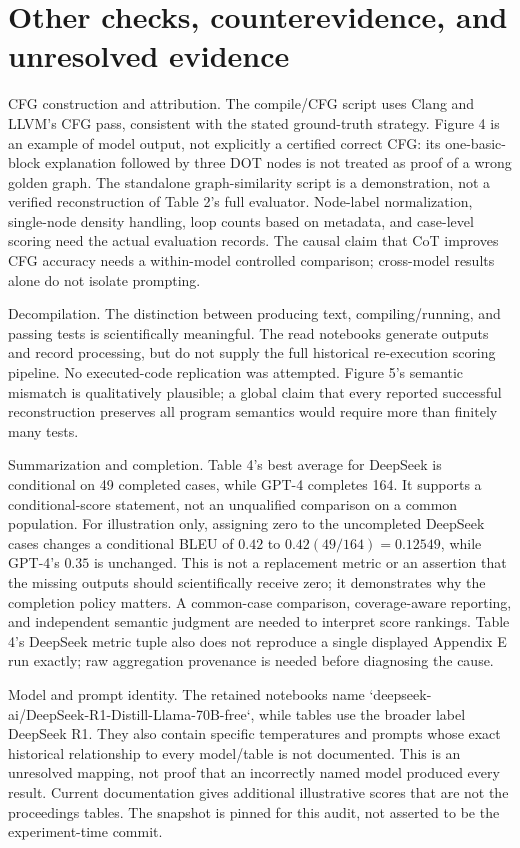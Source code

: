 \documentclass[10pt]{article}
\begin{document}
\section*{Other checks, counterevidence, and unresolved evidence}
CFG construction and attribution. The compile/CFG script uses Clang and LLVM’s CFG pass, consistent with the stated ground-truth strategy. Figure 4 is an example of model output, not explicitly a certified correct CFG: its one-basic-block explanation followed by three DOT nodes is not treated as proof of a wrong golden graph. The standalone graph-similarity script is a demonstration, not a verified reconstruction of Table 2’s full evaluator. Node-label normalization, single-node density handling, loop counts based on metadata, and case-level scoring need the actual evaluation records. The causal claim that CoT improves CFG accuracy needs a within-model controlled comparison; cross-model results alone do not isolate prompting.\par
Decompilation. The distinction between producing text, compiling/running, and passing tests is scientifically meaningful. The read notebooks generate outputs and record processing, but do not supply the full historical re-execution scoring pipeline. No executed-code replication was attempted. Figure 5’s semantic mismatch is qualitatively plausible; a global claim that every reported successful reconstruction preserves all program semantics would require more than finitely many tests.\par
Summarization and completion. Table 4’s best average for DeepSeek is conditional on 49 completed cases, while GPT-4 completes 164. It supports a conditional-score statement, not an unqualified comparison on a common population. For illustration only, assigning zero to the uncompleted DeepSeek cases changes a conditional BLEU of \(0.42\) to \(0.42(49/164)=0.12549\), while GPT-4’s \(0.35\) is unchanged. This is not a replacement metric or an assertion that the missing outputs should scientifically receive zero; it demonstrates why the completion policy matters. A common-case comparison, coverage-aware reporting, and independent semantic judgment are needed to interpret score rankings. Table 4’s DeepSeek metric tuple also does not reproduce a single displayed Appendix E run exactly; raw aggregation provenance is needed before diagnosing the cause.\par
Model and prompt identity. The retained notebooks name `deepseek-ai/DeepSeek-R1-Distill-Llama-70B-free`, while tables use the broader label DeepSeek R1. They also contain specific temperatures and prompts whose exact historical relationship to every model/table is not documented. This is an unresolved mapping, not proof that an incorrectly named model produced every result. Current documentation gives additional illustrative scores that are not the proceedings tables. The snapshot is pinned for this audit, not asserted to be the experiment-time commit.\par
\end{document}
